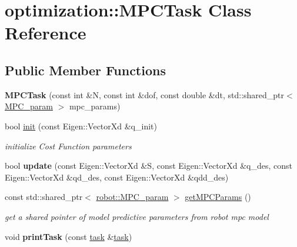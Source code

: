 \hypertarget{classoptimization_1_1_m_p_c_task}{}\section{optimization\+:\+:M\+P\+C\+Task Class Reference}
\label{classoptimization_1_1_m_p_c_task}
\subsection*{Public Member Functions}
\begin{DoxyCompactItemize}
\item 
\mbox{\label{classoptimization_1_1_m_p_c_task_af06a9d910c4de9316b9ea343b0a10325}} 
{\bfseries M\+P\+C\+Task} (const int \&N, const int \&dof, const double \&dt, std\+::shared\+\_\+ptr$<$ \hyperlink{structrobot_1_1_m_p_c__param}{M\+P\+C\+\_\+param} $>$ mpc\+\_\+params)
\item 
\mbox{\label{classoptimization_1_1_m_p_c_task_a96b8f4d4ede2b6d5b8e7fcbfa1d2d8da}} 
bool \hyperlink{classoptimization_1_1_m_p_c_task_a96b8f4d4ede2b6d5b8e7fcbfa1d2d8da}{init} (const Eigen\+::\+Vector\+Xd \&q\+\_\+init)
\begin{DoxyCompactList}\small\item\em initialize Cost Function parameters \end{DoxyCompactList}\item 
\mbox{\label{classoptimization_1_1_m_p_c_task_a4095051cca0a43df5807be4b00c5b5b7}} 
bool {\bfseries update} (const Eigen\+::\+Vector\+Xd \&S, const Eigen\+::\+Vector\+Xd \&q\+\_\+des, const Eigen\+::\+Vector\+Xd \&qd\+\_\+des, const Eigen\+::\+Vector\+Xd \&qdd\+\_\+des)
\item 
const std\+::shared\+\_\+ptr$<$ \hyperlink{structrobot_1_1_m_p_c__param}{robot\+::\+M\+P\+C\+\_\+param} $>$ \hyperlink{classoptimization_1_1_m_p_c_task_a11d2f4444268ce63a2472a9500c512cd}{get\+M\+P\+C\+Params} ()
\begin{DoxyCompactList}\small\item\em get a shared pointer of model predictive parameters from robot mpc model \end{DoxyCompactList}\item 
\mbox{\label{classoptimization_1_1_m_p_c_task_a5ad8d22589b6e6674328c79b58689dd9}} 
void {\bfseries print\+Task} (const \hyperlink{structoptimization_1_1task}{task} \&\hyperlink{structoptimization_1_1task}{task})
\end{DoxyCompactItemize}



